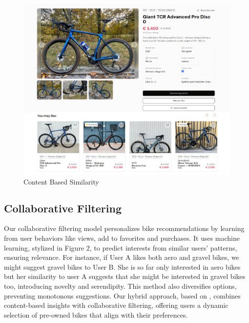 \documentclass{article}
\begin{document}
\begin{figure}[h]
\centering
\includegraphics[width=1\textwidth]{content.pdf}
\caption{Content Based Similarity}
\end{figure}


\subsection*{Collaborative Filtering}
Our collaborative filtering model personalizes bike recommendations by learning from user behaviors like views, add to favorites and purchases. It uses machine learning, stylized in Figure 2, to predict interests from similar users' patterns, ensuring relevance. For instance, if User A likes both aero and gravel bikes, we might suggest gravel bikes to User B. She is so far only interested in aero bikes but her similarity to user A suggests that she might be interested in gravel bikes too, introducing novelty and serendipity. This method also diversifies options, preventing monotonous suggestions. Our hybrid approach, based on \cite{kula2015metadata}, combines content-based insights with collaborative filtering, offering users a dynamic selection of pre-owned bikes that align with their preferences.
\end{document}
